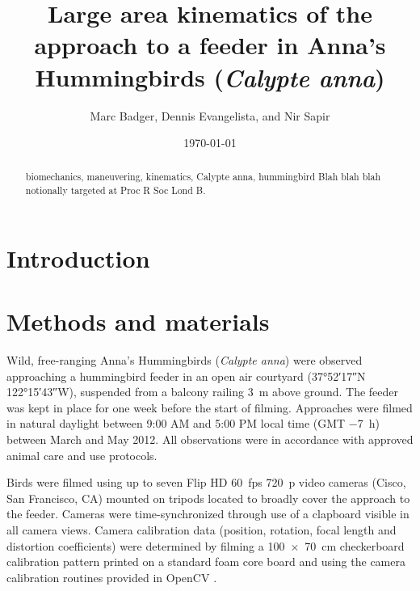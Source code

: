 \documentclass{rspublic}
\newcommand{\Calypteanna}{\emph{Calypte anna}}
\begin{document}
\title[Anna's Hummingbird approach kinematics]{Large area kinematics of the approach to a feeder in Anna's Hummingbirds (\Calypteanna)}
\author[M. Badger, D. Evangelista, and N. Sapir]{Marc Badger, Dennis Evangelista, and Nir Sapir}
\date{\today}
\label{firstpage}
\maketitle


\begin{abstract}{biomechanics, maneuvering, kinematics, Calypte anna, hummingbird}
Blah blah blah notionally targeted at Proc R Soc Lond B. 
\end{abstract}




\section{Introduction}
\section{Methods and materials}
Wild, free-ranging Anna's Hummingbirds (\Calypteanna) were observed approaching a hummingbird feeder in an open air courtyard (\ang{37;52;17}N \ang{122;15;43}W), suspended from a balcony railing \SI{3}{\meter} above ground.  The feeder was kept in place for one week before the start of filming. Approaches were filmed in natural daylight between 9:00 AM and 5:00 PM local time (GMT \SI{-7}{\hour}) between March and May 2012.  All observations were in accordance with approved animal care and use protocols.  

Birds were filmed using up to seven Flip HD \SI{60}{fps} \SI{720}{p} video cameras (Cisco, San Francisco, CA) mounted on tripods located to broadly cover the approach to the feeder. Cameras were time-synchronized through use of a clapboard visible in all camera views.  Camera calibration data (position, rotation, focal length and distortion coefficients) were determined by filming a \SI{100x70}{\centi\meter} checkerboard calibration pattern printed on a standard foam core board and using the camera calibration routines provided in OpenCV \citep{OpenCV, Bradski:2008}. 
\end{document}
